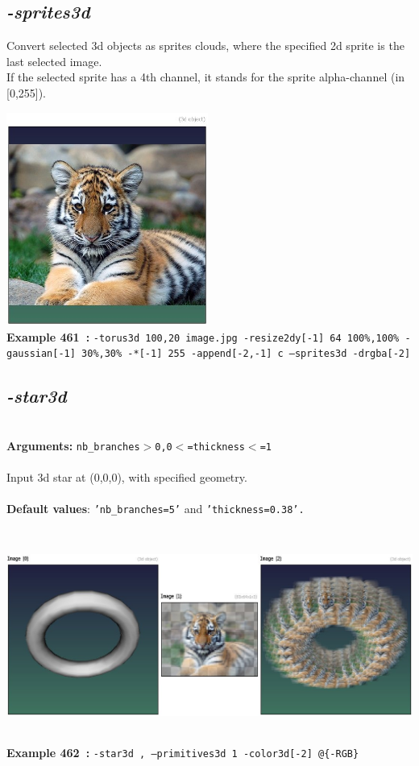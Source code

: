 \documentclass[a4paper,11pt,twoside]{book}
\begin{document}
\subsection{\emph{-sprites3d} }\vspace*{-0.5em}
Convert selected 3d objects as sprites clouds, where the specified 2d sprite is the last selected image.
~\\If the selected sprite has a 4th channel, it stands for the sprite alpha-channel (in [0,255]).
\begin{center}\includegraphics[keepaspectratio=true,height=7cm,width=\textwidth]{img/gmic_def461.jpg}\\
{\footnotesize \textbf{Example 461~:} \texttt{-torus3d 100,20 image.jpg -resize2dy[-1] 64 100\%,100\% -gaussian[-1] 30\%,30\% -*[-1] 255 -append[-2,-1] c --sprites3d -drgba[-2]}}
\end{center}

\subsection{\emph{-star3d} }\vspace*{-0.5em}
~\\\textbf{Arguments: } 
{\small \texttt{nb\_branches$>$0,0$<$=thickness$<$=1}}\\~\\
Input 3d star at (0,0,0), with specified geometry.
~\\~\\\textbf{Default values}: {\small \texttt{'nb\_branches=5'} and \texttt{'thickness=0.38'.}}
\begin{center}\includegraphics[keepaspectratio=true,height=7cm,width=\textwidth]{img/gmic_def462.jpg}\\
{\footnotesize \textbf{Example 462~:} \texttt{-star3d , --primitives3d 1 -color3d[-2] @\{-RGB\}}}
\end{center}
\end{document}
